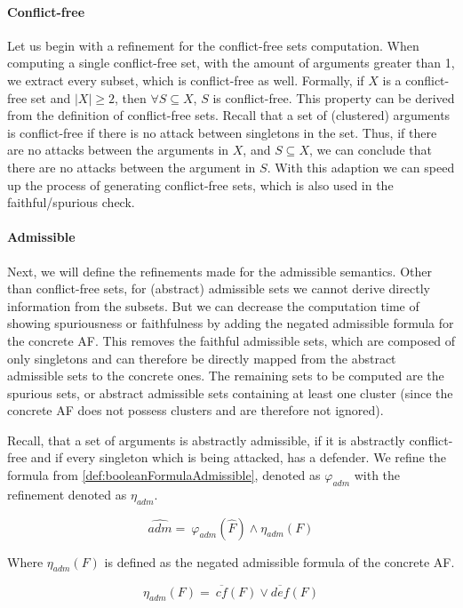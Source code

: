 \paragraph{Conflict-free} Let us begin with a refinement for the conflict-free sets computation. When computing a single conflict-free set, with the amount of arguments greater than 1, we extract every subset, which is conflict-free as well. Formally, if $X$ is a conflict-free set and $|X|\geq 2$, then $\forall S \subseteq X$, $S$ is conflict-free. This property can be derived from the definition of conflict-free sets. Recall that a set of (clustered) arguments is conflict-free if there is no attack between singletons in the set. Thus, if there are no attacks between the arguments in $X$, and $S \subseteq X$, we can conclude that there are no attacks between the argument in $S$. With this adaption we can speed up the process of generating conflict-free sets, which is also used in the faithful/spurious check.

\paragraph{Admissible} Next, we will define the refinements made for the admissible semantics. Other than conflict-free sets, for (abstract) admissible sets we cannot derive directly information from the subsets. But we can decrease the computation time of showing spuriousness or faithfulness by adding the negated admissible formula for the concrete AF. This removes the faithful admissible sets, which are composed of only singletons and can therefore be directly mapped from the abstract admissible sets to the concrete ones. The remaining sets to be computed are the spurious sets, or abstract admissible sets containing at least one cluster (since the concrete AF does not possess clusters and are therefore not ignored).

Recall, that a set of arguments is abstractly admissible, if it is abstractly conflict-free and if every singleton which is being attacked, has a defender. We refine the formula from \cref{def:booleanFormulaAdmissible}, denoted as $\varphi_{adm}$ with the refinement denoted as $\eta_{adm}$.


$$
    \hat{adm}=\ \varphi_{adm}(\hat{F}) \land \eta_{adm}(F)
$$


Where $\eta_{adm}(F)$ is defined as the negated admissible formula of the concrete AF.


$$
    \eta_{adm}(F)=\ \overline{cf}(F) \lor \overline{def}(F)
$$



